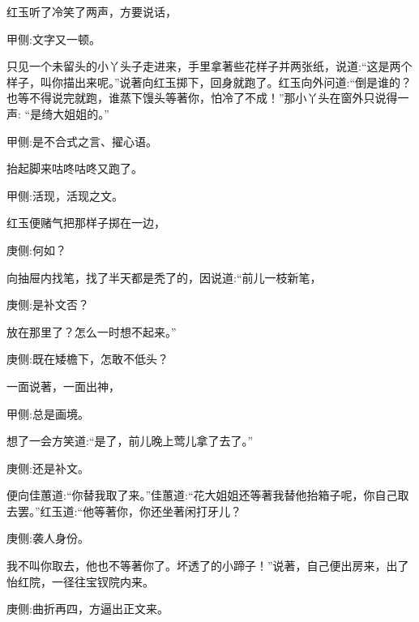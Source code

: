 \begin{parag}
    红玉听了冷笑了两声，方要说话，\begin{note}甲侧:文字又一顿。\end{note}只见一个未留头的小丫头子走进来，手里拿著些花样子并两张纸，说道:“这是两个样子，叫你描出来呢。”说著向红玉掷下，回身就跑了。红玉向外问道:“倒是谁的？也等不得说完就跑，谁蒸下馒头等著你，怕冷了不成！”那小丫头在窗外只说得一声: “是绮大姐姐的。”\begin{note}甲侧:是不合式之言、擢心语。\end{note}抬起脚来咕咚咕咚又跑了。\begin{note}甲侧:活现，活现之文。\end{note}红玉便赌气把那样子掷在一边，\begin{note}庚侧:何如？\end{note}向抽屉内找笔，找了半天都是秃了的，因说道:“前儿一枝新笔，\begin{note}庚侧:是补文否？\end{note}放在那里了？怎么一时想不起来。”\begin{note}庚侧:既在矮檐下，怎敢不低头？\end{note}一面说著，一面出神，\begin{note}甲侧:总是画境。\end{note}想了一会方笑道:“是了，前儿晚上莺儿拿了去了。”\begin{note}庚侧:还是补文。\end{note}便向佳蕙道:“你替我取了来。”佳蕙道:“花大姐姐还等著我替他抬箱子呢，你自己取去罢。”红玉道:“他等著你，你还坐著闲打牙儿？\begin{note}庚侧:袭人身份。\end{note}我不叫你取去，他也不等著你了。坏透了的小蹄子！”说著，自己便出房来，出了怡红院，一径往宝钗院内来。\begin{note}庚侧:曲折再四，方逼出正文来。\end{note}
\end{parag}


